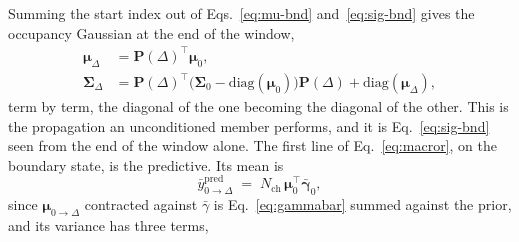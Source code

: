 \begin{appendixbox}
Summing the start index out of Eqs.~\ref{eq:mu-bnd} and~\ref{eq:sig-bnd} gives the occupancy
Gaussian at the end of the window,
\begin{align}
  \bm{\mu}_\Delta &= \mathbf{P}(\Delta)^\top \bm{\mu}_0, \label{eq:mu-prop}\\
  \bm{\Sigma}_\Delta &= \mathbf{P}(\Delta)^\top\bigl(\bm{\Sigma}_0-\mathrm{diag}(\bm{\mu}_0)\bigr)\mathbf{P}(\Delta) + \mathrm{diag}(\bm{\mu}_\Delta), \label{eq:sig-prop}
\end{align}
term by term, the diagonal of the one becoming the diagonal of the other. This is the
propagation an unconditioned member performs, and it is Eq.~\ref{eq:sig-bnd} seen from the end
of the window alone.
The first line of Eq.~\ref{eq:macror}, on the boundary state, is the predictive. Its mean is
\begin{equation}
  \bar{y}^{\mathrm{pred}}_{0\to\Delta} \;=\; N_{\mathrm{ch}}\,\bm{\mu}_0^\top \bar{\bm{\gamma}}_0,
  \label{eq:ypred}
\end{equation}
since $\bm{\mu}_{0\to\Delta}$ contracted against $\bar{\gamma}$ is Eq.~\ref{eq:gammabar}
summed against the prior, and its variance has three terms,

\end{appendixbox}
